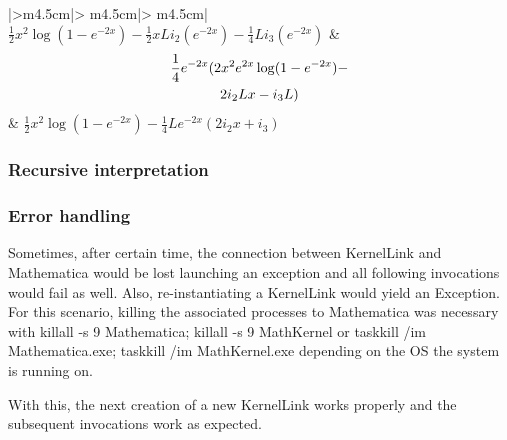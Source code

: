 \begin{longtable}{|>{\centering\arraybackslash}m{4.5cm}|>
{\centering\arraybackslash}m{4.5cm}|>
{\centering\arraybackslash}m{4.5cm}|}
\scriptsize{ $\frac{1}{2} x^2 \log \left(1-e^{-2 x}\right) - \frac{1}{2} x L i_ 2 \left(e^{-2 x}\right)-\frac{1}{4} L i_ 3 \left(e^{-2 x}\right)$ }          & \scriptsize { \begin{multline}  \frac{1}{4} e^{-2 x} (2 x^2 e^{2 x} \log (1-e^{-2 x})- \notag\\ 2 i_ 2 L x-i_ 3 L)  \end{multline} } & \scriptsize{ $\frac{1}{2} x^2 \log \left(1-e^{-2 x}\right)-\frac{1}{4} L e^{-2 x} \left(2 i_ 2 x+i_ 3\right)$ }      \\
\hline
\caption{Comparison of different simplification modes}

\label{comparison_simplification}

\end{longtable}
\subsubsection{Recursive interpretation}


\subsubsection{Error handling}
Sometimes, after certain time, the connection between {\codefont KernelLink} and {\codefont Mathematica} would be lost launching an exception and all following invocations would fail as well.
Also, re-instantiating a KernelLink would yield an Exception. For this scenario, killing the associated processes to Mathematica was necessary with {\codefont killall -s 9 Mathematica; killall -s 9 MathKernel
} or {\codefont taskkill /im Mathematica.exe; taskkill /im MathKernel.exe} depending on the OS the system is running on.

With this, the next creation of a new KernelLink works properly and the subsequent invocations work as expected.

